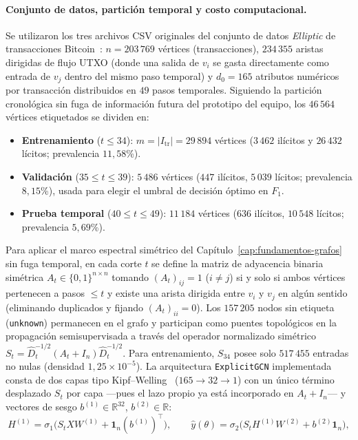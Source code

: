 \documentclass[a4paper,openany,oneside,10pt]{report}
\theoremstyle{pnlTeorema}
\theoremstyle{pnlDefinicion}
\theoremstyle{pnlObservacion}
\begin{document}
\paragraph{Conjunto de datos, partición temporal y costo computacional.}
Se utilizaron los tres archivos CSV originales del conjunto de datos
\emph{Elliptic} de transacciones Bitcoin~\cite{weber2019}: $n=203\,769$ vértices (transacciones), $234\,355$
aristas dirigidas de flujo UTXO (donde una salida de $v_i$ se gasta directamente como entrada de $v_j$ dentro del mismo paso temporal) y $d_0=165$ atributos numéricos por transacción distribuidos
en $49$ pasos temporales. Siguiendo la partición cronológica sin fuga de
información futura del prototipo del equipo, los $46\,564$ vértices etiquetados
se dividen en:
\begin{itemize}
\item \textbf{Entrenamiento} ($t\le 34$): $m=|I_{\mathrm{tr}}|=29\,894$ vértices
($3\,462$ ilícitos y $26\,432$ lícitos; prevalencia $11{,}58$\%).
\item \textbf{Validación} ($35\le t\le 39$): $5\,486$ vértices ($447$ ilícitos,
$5\,039$ lícitos; prevalencia $8{,}15$\%), usada para elegir el umbral de
decisión óptimo en $F_1$.
\item \textbf{Prueba temporal} ($40\le t\le 49$): $11\,184$ vértices ($636$
ilícitos, $10\,548$ lícitos; prevalencia $5{,}69$\%).
\end{itemize}
Para aplicar el marco espectral simétrico del Capítulo~\ref{cap:fundamentos-grafos} sin fuga temporal, en cada corte $t$ se define la matriz de adyacencia binaria simétrica $A_t\in\{0,1\}^{n\times n}$ tomando $(A_t)_{ij}=1$ ($i\neq j$) si y solo si ambos vértices pertenecen a pasos $\le t$ y existe una arista dirigida entre $v_i$ y $v_j$ en algún sentido (eliminando duplicados y fijando $(A_t)_{ii}=0$). Los $157\,205$ nodos sin etiqueta (\texttt{unknown}) permanecen en el grafo y
participan como puentes topológicos en la propagación semisupervisada a través del operador normalizado
simétrico $S_t=\widehat{D}_t^{-1/2}(A_t+I_n)\widehat{D}_t^{-1/2}$. Para entrenamiento,
$S_{34}$ posee solo $517\,455$ entradas no nulas (densidad $1{,}25\times 10^{-5}$).
La arquitectura \texttt{ExplicitGCN} implementada consta de dos capas tipo Kipf--Welling~\cite{kipf2017} ($165\to 32\to 1$) con un único término desplazado $S_t$ por capa —pues el lazo propio ya está incorporado en $A_t+I_n$— y vectores de sesgo $b^{(1)}\in\mathbb{R}^{32}$, $b^{(2)}\in\mathbb{R}$:
\[
H^{(1)}=\sigma_1\bigl(S_t X W^{(1)}+\mathbf{1}_n(b^{(1)})^\top\bigr),\qquad
\hat y(\theta)=\sigma_2\bigl(S_t H^{(1)}W^{(2)}+b^{(2)}\mathbf{1}_n\bigr),
\]
\end{document}
